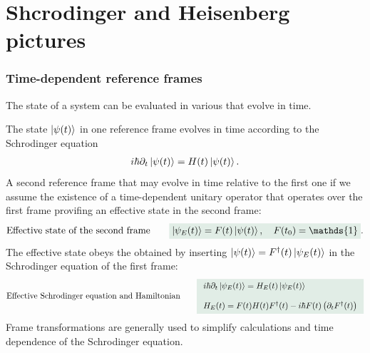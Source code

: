 \chapter{Shcrodinger and Heisenberg pictures}
%
\subsection{Time-dependent reference frames}
The state of a system can be evaluated in various  that evolve in time. 

The state $\left|\psi(t)\right\rangle$ in one reference frame evolves in time according to the Schrodinger equation
\begin{align*}
    i\hbar\partial_t\left|\psi(t)\right\rangle=H(t)\left|\psi(t)\right\rangle.
\end{align*}
A second reference frame that may evolve in time relative to the first one if we assume the existence of a time-dependent unitary operator that operates over 
the first frame provifing an effective state in the second frame: 
\begin{align}
    \text{Effective state of the second frame}\qquad\highlight{\ket{\psi_E(t)}=F(t)\ket{\psi(t)},\quad F(t_0)=\mathds{1}}.
\end{align}
The effective state obeys the  obtained by inserting $\left|\psi(t)\right\rangle=F^\dagger(t)\left|\psi_E(t)\right\rangle$ in the Schrodinger equation of the first frame:
\begin{align}
    \text{Effective Schrodinger equation and Hamiltonian}\qquad\highlight{\begin{array}{l}
        i\hbar\partial_t\ket{\psi_E(t)}=H_E(t)\ket{\psi_E(t)}\\\\
        H_E(t)=F(t)H(t)F^\dagger(t)-i\hbar F(t)\left(\partial_tF^\dagger(t)\right)
    \end{array}}
\end{align}
Frame transformations are generally used to simplify calculations and time dependence of the Schrodinger equation.
